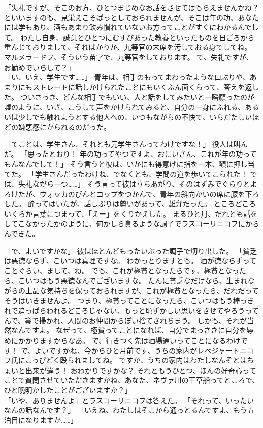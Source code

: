 「失礼ですが、そこのお方、ひとつまじめなお話をさせてはもらえませんかね？
といいますのも、見栄えこそぱっとしておられませんが、そこは年の功、あなたには学もあり、酒もあまり飲み慣れていないお方ってことがすぐにわかるんでして。
わたし自身、誠意とひとつにむすびあった教養といったものを日ごろから重んじておりまして、そればかりか、九等官の末席を汚しておる身でしてね。
マルメラードフ、そういう苗字で、九等官をしております。
で、失礼ですが、お勤めでいらして？」\\
「い、いえ、学生です……」
青年は、相手のもってまわったような口ぶりや、あまりにもストレートに話しかけられたことにもいくぶん面くらって、答えを返した。
ついさっき、どんな相手でもいい、人と話をしてみたいと一瞬願ったのが嘘のように、いざ、こうして声をかけられてみると、自分の一身にふれる、あるいは少しでも触れようとする他人への、いつもながらの不快で、いらだたしいほどの嫌悪感にかられるのだった。

「てことは、学生さん、それとも元学生さんってわけですな！」
役人は叫んだ。
「思ったとおり！
年の功ってやつですよ、おにいさん、これが年の功ってもんなんでして！」
そう言うと彼は、いかにも得意げに指を一本、額に押し当てた。
「学生さんだったわけね、でなくとも、学問の道を歩いてこられた！
では、失礼ながら一つ……」
そう言って彼は立ちあがり、そのはずみでぐらりとよろけたが、ウォッカのびんとコップをつかんで、青年の斜向かいの席に腰を下ろした。
酔ってはいたが、話しぶりは勢いがあって、雄弁だった。
ところどころいくらか言葉につまって、「えー」をくりかえした。
まるひと月、だれとも話をしてこなかったかのように、何かしら貪るような調子でラスコーリニコフにからんできた。

「で、よいですかな」
彼はほとんどもったいぶった調子で切り出した。
「貧乏は悪徳ならず、こいつは真理ですな。
わかっとりますとも。
酒が徳ならずってことぐらい、まして、ね。
でも、これが極貧となったらです、極貧となったら、こいつはもう悪徳なんでございますな。
たんに貧乏なだけなら、生まれながらの上品な気持ちを保っておられますが、これが極貧となったら、だれだってそうはいきませんよ。
つまり、極貧ってことになったら、こいつはもう棒っきれで追っぱらわれるどころじゃない、もっと恥ずかしい思いをさせてやろうってんで、箒で掃かれ、人間のお仲間からぽい捨てされちまう。
しかも、それが当然なんですよ。
なぜって、極貧ってことになれば、自分でまっさきに自分を辱めにかかりますからなあ。
で、行きつく先は酒場通いってことになるわけです！
で、よいですかね、今からひと月前です、うちの家内がレベジャートニコフ氏にこっぴどく殴られましてね。
ですが、うちの家内はわたしなんぞとはちょいと出来が違う！
おわかりですかな？
それともうひとつ、ほんの好奇心ってことで質問させていただきますがね、あなた、ネヴァ川の干草船ってところで、ひと晩明かしたことがございますか？」\\
「いや、ありませんよ」とラスコーリニコフは答えた。
「それって、いったいなんの話なんです？」
「いえね、わたしはそこから通っとるんですよ、もう五泊目になりますか……」

